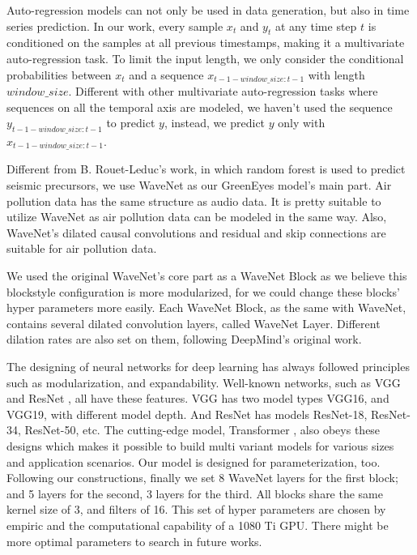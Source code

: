 \documentclass[sigconf]{acmart}
\begin{document}
Auto-regression models can not only be used in data generation, but also in time series prediction. In our work, every sample $x_t$ and $y_t$ at any time step $t$ is conditioned on the samples at all previous timestamps, making it a multivariate auto-regression task. To limit the input length,  we only consider the conditional probabilities between $x_t$ and a sequence $x_{t-1-window\_size:t-1}$ with length $window\_size$. Different with other multivariate auto-regression tasks where sequences on all the temporal axis are modeled, we haven't used the sequence $y_{t-1-window\_size:t-1}$ to predict $y$, instead, we predict $y$ only with $x_{t-1-window\_size:t-1}$.

Different from B. Rouet-Leduc's work\cite{rouet2017machine}, in which random forest is used to predict seismic precursors, we use WaveNet as our GreenEyes model's main part. Air pollution data has the same structure as audio data. It is pretty suitable to utilize WaveNet as air pollution data can be modeled in the same way. Also, WaveNet's dilated causal convolutions and residual and skip connections are suitable for air pollution data.

We used the original WaveNet's core part as a WaveNet Block as we believe this block\-style configuration is more modularized, for we could change these blocks' hyper parameters more easily. Each WaveNet Block, as the same with WaveNet, contains several dilated convolution layers, called WaveNet Layer. Different dilation rates are also set on them, following DeepMind's original work. 

The designing of neural networks for deep learning has always followed principles such as modularization, and expandability. Well-known networks, such as VGG \cite{simonyan2014very} and ResNet \cite{he2016deep}, all have these features. VGG has two model types VGG16, and VGG19, with different model depth. And ResNet has models ResNet-18, ResNet-34, ResNet-50, etc. The cutting-edge model, Transformer \cite{vaswani2017attention}, also obeys these designs which makes it possible to build multi variant models for various sizes and application scenarios. Our model is designed for parameterization, too. Following our constructions, finally we set 8 WaveNet layers for the first block; and 5 layers for the second, 3 layers for the third. All blocks share the same kernel size of 3, and filters of 16. This set of hyper parameters are chosen by empiric and the computational capability of a 1080 Ti GPU. There might be more optimal parameters to search in future works.
\end{document}
